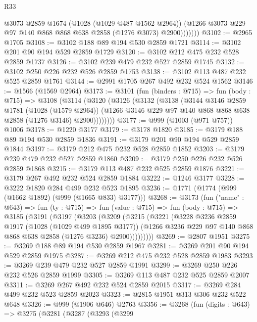 \begin{lexlean}{R33}
\begin{coremodule}
                @3073
                @2859
                @1674
                (@1028 (@1029 @487 @1562 @2964))
                (@1266 @3073 @229 @97 @140 @868 @868 @638 @2858 (@1276 @3073) @2900)))))))
@3102 := @2965 @1705
@3108 := @3102 @188 @89 @194 @530 @2859 @1721
@3114 := @3102 @201 @90 @194 @529 @2859 @1729
@3120 := @3102 @212 @475 @232 @528 @2859 @1737
@3126 := @3102 @239 @479 @232 @527 @2859 @1745
@3132 := @3102 @250 @226 @232 @526 @2859 @1753
@3138 := @3102 @113 @487 @232 @525 @2859 @1761
@3144 := @2991 @1705 @267 @492 @232 @524 @1562
@3146 := @1566 (@1569 @2964)
@3173 := @3101
    (fun (binders : @715) =>
    fun (body : @715) =>
    @3108
      (@3114
        (@3120
          (@3126
            (@3132
              (@3138
                (@3144
                  @3146
                  @2859
                  @1781
                  (@1028 (@1579 @2964))
                  (@1266 @3146 @229 @97 @140 @868 @868 @638 @2858 (@1276 @3146) @2900))))))))
@3177 := @999 (@1003 (@971 @757)) @1006
@3178 := @1220 @3177
@3179 := @3178 @1820
@3185 := @3179 @188 @89 @194 @530 @2859 @1836
@3191 := @3179 @201 @90 @194 @529 @2859 @1844
@3197 := @3179 @212 @475 @232 @528 @2859 @1852
@3203 := @3179 @239 @479 @232 @527 @2859 @1860
@3209 := @3179 @250 @226 @232 @526 @2859 @1868
@3215 := @3179 @113 @487 @232 @525 @2859 @1876
@3221 := @3179 @267 @492 @232 @524 @2859 @1884
@3222 := @1246 @3177
@3228 := @3222 @1820 @284 @499 @232 @523 @1895
@3236 := @1771 (@1774 (@999 (@1662 @1892) (@999 (@1665 @833) @3177)))
@3268 := @3173
    (fun ("name" : @643) =>
    fun (ty : @715) =>
    fun (value : @715) =>
    fun (body : @715) =>
    @3185
      (@3191
        (@3197
          (@3203
            (@3209
              (@3215
                (@3221
                  (@3228
                    @3236
                    @2859
                    @1917
                    (@1028 (@1029 @499 @1895 @3177))
                    (@1266 @3236 @229 @97 @140 @868 @868 @638 @2858 (@1276 @3236) @2900)))))))))
@3269 := @2807 @1951
@3275 := @3269 @188 @89 @194 @530 @2859 @1967
@3281 := @3269 @201 @90 @194 @529 @2859 @1975
@3287 := @3269 @212 @475 @232 @528 @2859 @1983
@3293 := @3269 @239 @479 @232 @527 @2859 @1991
@3299 := @3269 @250 @226 @232 @526 @2859 @1999
@3305 := @3269 @113 @487 @232 @525 @2859 @2007
@3311 := @3269 @267 @492 @232 @524 @2859 @2015
@3317 := @3269 @284 @499 @232 @523 @2859 @2023
@3323 := @2815 @1951 @313 @306 @232 @522 @648
@3326 := @999 (@1906 @646) @2763
@3356 := @3268
    (fun (digits : @643) =>
    @3275
      (@3281
        (@3287
          (@3293
            (@3299

\end{coremodule}
\end{lexlean}
